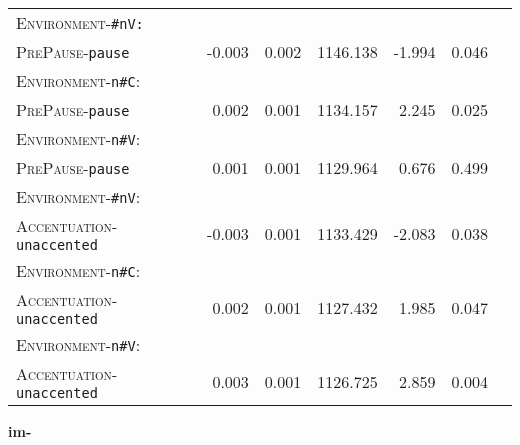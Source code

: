 \begin{table}
{\begin{tabular} {lrrrrrr}
		\textsc{Environment}-\texttt{\#nV:}&&&&&\\
		\textsc{PrePause}-\texttt{pause} & -0.003 & 0.002 & 1146.138 & -1.994 & 0.046 \\ 
		
		\textsc{Environment}-\texttt{n\#C}:&&&&&\\
		\textsc{PrePause}-\texttt{pause} & 0.002 & 0.001 & 1134.157 & 2.245 & 0.025 \\ 
		
		\textsc{Environment}-\texttt{n\#V}:&&&&&\\
		\textsc{PrePause}-\texttt{pause} & \color[HTML]{9B9B9B} 0.001 & \color[HTML]{9B9B9B} 0.001 & \color[HTML]{9B9B9B} 1129.964 & \color[HTML]{9B9B9B} 0.676 & \color[HTML]{9B9B9B} 0.499 \\ 
		
		\textsc{Environment}-\texttt{\#nV}:&&&&&\\
		\textsc{Accentuation}-\texttt{unaccented} & -0.003 & 0.001 & 1133.429 & -2.083 & 0.038 \\ 
		
		\textsc{Environment}-\texttt{n\#C}:&&&&&\\
		\textsc{Accentuation}-\texttt{unaccented} & 0.002 & 0.001 & 1127.432 & 1.985 & 0.047 \\ 
		
		\textsc{Environment}-\texttt{n\#V}:&&&&&\\
		\textsc{Accentuation}-\texttt{unaccented} & 0.003 & 0.001 & 1126.725 & 2.859 & 0.004 \\ 
		\midrule
		
			\end{tabular}
}


\end{table}
\vspace*{-0.3cm}

\clearpage

\textbf{{im-}}

